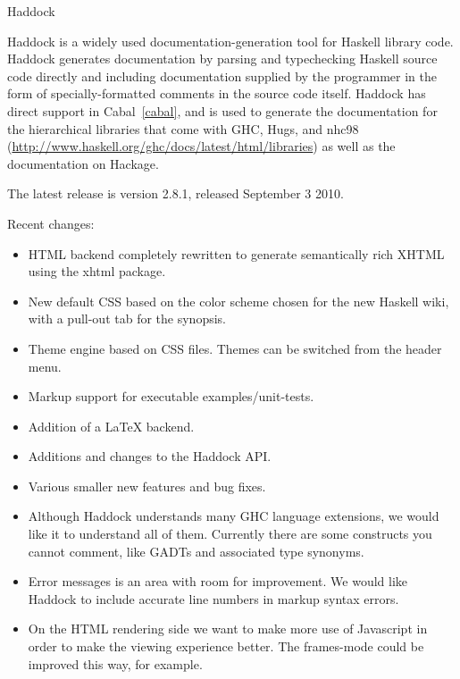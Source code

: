 \begin{hcarentry}[updated]{Haddock}
\label{haddock}
\makeheader

Haddock is a widely used documentation-generation tool for Haskell
library code.  Haddock generates documentation by parsing and typechecking
Haskell source code directly and including documentation supplied by the
programmer in the form of specially-formatted comments in the source code
itself.  Haddock has direct support in Cabal~\cref{cabal}, and is used to
generate the documentation for the hierarchical libraries that come with GHC,
Hugs, and nhc98
(\url{http://www.haskell.org/ghc/docs/latest/html/libraries}) as well as
the documentation on Hackage.

The latest release is version 2.8.1, released September 3 2010.

\Separate
Recent changes:
\begin{itemize}
\item HTML backend completely rewritten to generate semantically rich XHTML
      using the xhtml package.
\item New default CSS based on the color scheme chosen for the new Haskell
      wiki, with a pull-out tab for the synopsis.
\item Theme engine based on CSS files. Themes can be switched from the
      header menu.
\item Markup support for executable examples/unit-tests.
\item Addition of a LaTeX backend.
\item Additions and changes to the Haddock API.
\item Various smaller new features and bug fixes.
\end{itemize}

\FuturePlans
\begin{itemize}
\item Although Haddock understands many GHC language extensions, we would like it to
understand all of them. Currently there are some constructs you cannot comment,
like GADTs and associated type synonyms.
 
\item Error messages is an area with room for improvement. We would like Haddock
to include accurate line numbers in markup syntax errors.

\item On the HTML rendering side we want to make more use of Javascript in order to make
the viewing experience better. The frames-mode could be improved this way, for
example.


\end{itemize}
\end{hcarentry}

